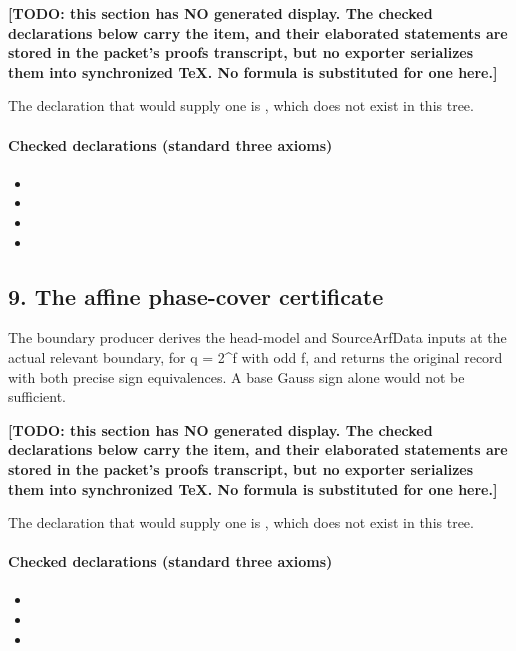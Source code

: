 \par\noindent\textbf{[TODO: this section has NO generated display. The checked declarations below carry the item, and their elaborated statements are stored in the packet's proofs transcript, but no exporter serializes them into synchronized TeX. No formula is substituted for one here.]}
\par\noindent The declaration that would supply one is , which does not exist in this tree.
\paragraph{Checked declarations (standard three axioms)}
\begin{itemize}
\item {}
\item {}
\item {}
\item {}
\end{itemize}

\subsection*{9. The affine phase-cover certificate}
The boundary producer derives the head-model and SourceArfData inputs at the actual relevant boundary, for q = 2\textasciicircum{}f with odd f, and returns the original record with both precise sign equivalences. A base Gauss sign alone would not be sufficient.

\par\noindent\textbf{[TODO: this section has NO generated display. The checked declarations below carry the item, and their elaborated statements are stored in the packet's proofs transcript, but no exporter serializes them into synchronized TeX. No formula is substituted for one here.]}
\par\noindent The declaration that would supply one is , which does not exist in this tree.
\paragraph{Checked declarations (standard three axioms)}
\begin{itemize}
\item {}
\item {}
\item {}
\end{itemize}

